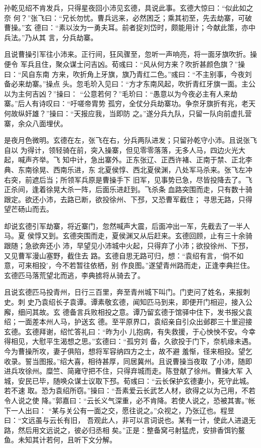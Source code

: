 孙乾见绍不肯发兵，只得星夜回小沛见玄德，具说此事。玄德大惊曰：“似此如之奈
何？”张飞曰：“兄长勿忧。曹兵远来，必然困乏；乘其初至，先去劫寨，可破曹操。”玄
德曰：“素以汝为一勇夫耳。前者捉刘岱时，颇能用计；今献此策，亦中兵法。”乃从其
言，分兵劫寨。

且说曹操引军往小沛来。正行间，狂风骤至，忽听一声响亮，将一面牙旗吹折。操便令
军兵且住，聚众谋士问吉凶。荀彧曰：“风从何方来？吹折甚颜色旗？”操曰：“风自东南
方来，吹折角上牙旗，旗乃青红二色。”彧曰：“不主别事，今夜刘备必来劫寨。”操点
头。忽毛玠入见曰：“方才东南风起，吹折青红牙旗一面。主公以为主何吉凶？”操曰：
“公意若何？”毛玠曰：“愚意以为今夜必主有人来劫寨。”后人有诗叹曰：“吁嗟帝胄势
孤穷，全仗分兵劫寨功。争奈牙旗折有兆，老天何故纵奸雄？”操曰：“天报应我，当即防
之。”遂分兵九队，只留一队向前虚扎营寨，余众八面埋伏。

是夜月色微明。玄德在左，张飞在右，分兵两队进发；只留孙乾守小沛。且说张飞自以
为得计，领轻骑在前，突入操寨，但见零零落落，无多人马，四边火光大起，喊声齐举。飞
知中计，急出寨外。正东张辽、正西许褚、正南于禁、正北李典、东南徐晃、西南乐进，东
北夏侯惇、西北夏侯渊，八处军马杀来。张飞左冲右突，前遮后当；所领军兵原是曹操手下
旧军，见事势已急，尽皆投降去了。飞正杀间，逢着徐晃大杀一阵，后面乐进赶到。飞杀条
血路突围而走，只有数十骑跟定。欲还小沛，去路已断，欲投徐州、下邳，又恐曹军截住；
寻思无路，只得望芒砀山而去。

却说玄德引军劫寨，将近寨门，忽然喊声大震，后面冲出一军，先截去了一半人马。夏
侯惇又到。玄德突围而走，夏侯渊又从后赶来。玄德回顾，止有三十余骑跟随；急欲奔还小
沛，早望见小沛城中火起，只得弃了小沛；欲投徐州、下邳，又见曹军漫山塞野，截住去
路。玄德自思无路可归，想：“袁绍有言，‘倘不如意，可来相投’，今不若暂往依栖，别
作良图。”遂望青州路而走，正逢李典拦住。玄德匹马落荒望北而逃，李典掳将从骑去了。

且说玄德匹马投青州，日行三百里，奔至青州城下叫门。门吏问了姓名，来报刺史。刺
史乃袁绍长子袁谭。谭素敬玄德，闻知匹马到来，即便开门相迎，接入公廨，细问其故。玄
德备言兵败相投之意。谭乃留玄德于馆驿中住下，发书报父袁绍；一面差本州人马，护送玄
德。至平原界口，袁绍亲自引众出邺郡三十里迎接玄德。玄德拜谢，绍忙答礼曰：“昨为小
儿抱病，有失救援，于心怏怏不安。今幸得相见，大慰平生渴想之思。”玄德曰：“孤穷刘
备，久欲投于门下，奈机缘未遇。今为曹操所攻，妻子俱陷，想将军容纳四方之士，故不避
羞惭，径来相投。望乞收录。誓当图报。”绍大喜，相待甚厚，同居冀州。且说曹操当夜取
了小沛，随即进兵攻徐州。糜竺、简雍守把不住，只得弃城而走。陈登献了徐州。曹操大军
入城，安民已毕，随唤众谋士议取下邳。荀彧曰：“云长保护玄德妻小，死守此城。若不速
取。恐为袁绍所窃。”操曰：“吾素爱云长武艺人材，欲得之以为己用，不若令人说之使
降。”郭嘉曰：“云长义气深重，必不肯降。若使人说之，恐被其害。”帐下一人出曰：
“某与关公有一面之交，愿往说之。”众视之，乃张辽也。程昱曰：“文远虽与云长有旧，
吾观此人，非可以言词说也。某有一计，使此人进退无路，然后用文远说之，彼必归丞相
矣。”正是：整备窝弓射猛虎，安排香饵钓鳌鱼。未知其计若何，且听下文分解。